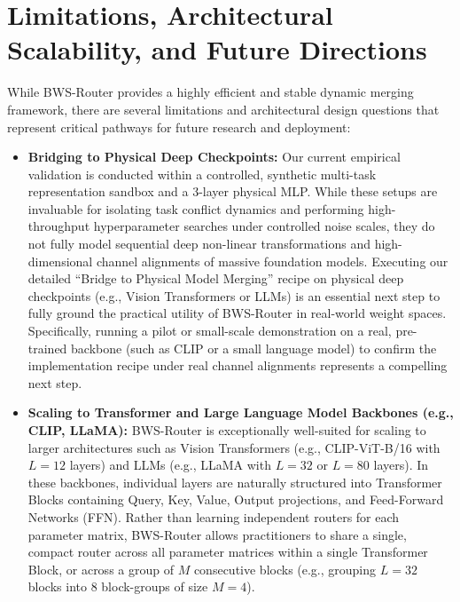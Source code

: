 \section{Limitations, Architectural Scalability, and Future Directions}
\label{app:limitations_scalability}
While BWS-Router provides a highly efficient and stable dynamic merging framework, there are several limitations and architectural design questions that represent critical pathways for future research and deployment:
\begin{itemize}
    \item \textbf{Bridging to Physical Deep Checkpoints:} Our current empirical validation is conducted within a controlled, synthetic multi-task representation sandbox and a 3-layer physical MLP. While these setups are invaluable for isolating task conflict dynamics and performing high-throughput hyperparameter searches under controlled noise scales, they do not fully model sequential deep non-linear transformations and high-dimensional channel alignments of massive foundation models. Executing our detailed ``Bridge to Physical Model Merging'' recipe on physical deep checkpoints (e.g., Vision Transformers or LLMs) is an essential next step to fully ground the practical utility of BWS-Router in real-world weight spaces. Specifically, running a pilot or small-scale demonstration on a real, pre-trained backbone (such as CLIP or a small language model) to confirm the implementation recipe under real channel alignments represents a compelling next step.
    \item \textbf{Scaling to Transformer and Large Language Model Backbones (e.g., CLIP, LLaMA):} BWS-Router is exceptionally well-suited for scaling to larger architectures such as Vision Transformers (e.g., CLIP-ViT-B/16 with $L=12$ layers) and LLMs (e.g., LLaMA with $L=32$ or $L=80$ layers). In these backbones, individual layers are naturally structured into Transformer Blocks containing Query, Key, Value, Output projections, and Feed-Forward Networks (FFN). Rather than learning independent routers for each parameter matrix, BWS-Router allows practitioners to share a single, compact router across all parameter matrices within a single Transformer Block, or across a group of $M$ consecutive blocks (e.g., grouping $L=32$ blocks into 8 block-groups of size $M=4$). 
    

\end{itemize}
